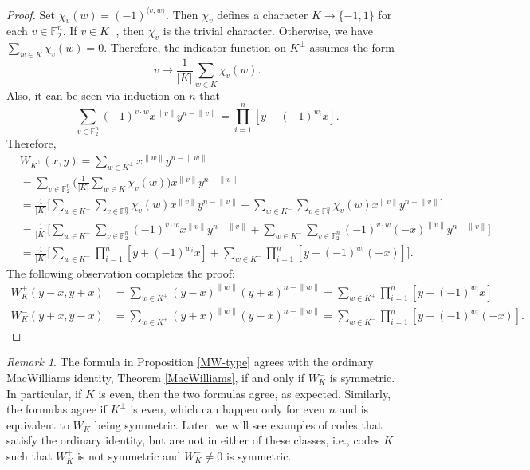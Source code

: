 \documentclass[a4paper,reqno]{amsart}
\theoremstyle{definition}
\theoremstyle{remark} \newtheorem{remark}[theorem]{Remark}
\numberwithin{equation}{section}
\begin{document}
\begin{proof}
Set \(\chi_v(w) = (-1)^{\langle v, w \rangle}\). Then \(\chi_v\) defines a character \(K \to \{-1, 1\}\) for each \(v \in \mathbb{F}_2^n\). If \(v \in K^\perp\), then \(\chi_v\) is the trivial character. Otherwise, we have \(\sum_{w \in K} \chi_v(w) = 0\). Therefore, the indicator function on \(K^\perp\) assumes the form
\begin{equation*}
    v \mapsto \frac{1}{\lvert K \rvert}\sum_{w \in K} \chi_v(w).
\end{equation*}
Also, it can be seen via induction on \(n\) that
\begin{equation*}
    \sum_{v \in \mathbb{F}_2^n} (-1)^{v \cdot w}x^{\lVert v \rVert}y^{n - \lVert v \rVert} = \prod_{i=1}^n[y + (-1)^{w_i}x]. 
\end{equation*}
Therefore,
\begin{align*}
    &W_{K^\perp}(x, y) = \sum_{w \in K^\perp}x^{\lVert w \rVert}y^{n-\lVert w \rVert} \\
    &= \sum_{v \in \mathbb{F}_2^n} \biggl(\frac{1}{\lvert K \rvert}\sum_{w \in K} \chi_v(w)\biggr)x^{\lVert v \rVert}y^{n-\lVert v \rVert} \\
    &= \frac{1}{\lvert K \rvert} \biggl[\sum_{w \in K^+}\sum_{v \in \mathbb{F}_2^n} \chi_v(w)x^{\lVert v \rVert}y^{n-\lVert v \rVert} + \sum_{w \in K^-}\sum_{v \in \mathbb{F}_2^n} \chi_v(w)x^{\lVert v \rVert}y^{n-\lVert v \rVert}\biggr] \\
    &= \frac{1}{\lvert K \rvert} \biggl[\sum_{w \in K^+}\sum_{v \in \mathbb{F}_2^n} (-1)^{v \cdot w}x^{\lVert v \rVert}y^{n-\lVert v \rVert} + \sum_{w \in K^-}\sum_{v \in \mathbb{F}_2^n} (-1)^{v \cdot w}(-x)^{\lVert v \rVert}y^{n-\lVert v \rVert}\biggr] \\
    &= \frac{1}{\lvert K \rvert} \biggl[\sum_{w \in K^+}\prod_{i=1}^n[y + (-1)^{w_i}x] + \sum_{w \in K^-}\prod_{i=1}^n[y + (-1)^{w_i}(-x)]\biggr].
\end{align*}
The following observation completes the proof:
\begin{align*}
    W_K^+ (y-x, y+x) &= \sum_{w \in K^+}(y-x)^{\lVert w \rVert}(y+x)^{n - \lVert w \rVert} = \sum_{w \in K^+} \prod_{i = 1}^n[y + (-1)^{w_i}x] \\
    W_K^- (y+x, y-x) &= \sum_{w \in K^+}(y+x)^{\lVert w \rVert}(y-x)^{n - \lVert w \rVert} = \sum_{w \in K^-} \prod_{i = 1}^n[y + (-1)^{w_i}(-x)].
\end{align*}
\end{proof}

\begin{remark}
    The formula in Proposition \ref{MW-type} agrees with the ordinary MacWilliams identity, Theorem \ref{MacWilliams}, if and only if \(W_K^-\) is symmetric. In particular, if \(K\) is even, then the two formulas agree, as expected. Similarly, the formulas agree if \(K^\perp\) is even, which can happen only for even \(n\) and is equivalent to \(W_K\) being symmetric. %
    Later, we will see examples of codes that satisfy the ordinary identity, but are not in either of these classes, i.e., codes \(K\) such that \(W_K^+\) is not symmetric and \(W_K^- \neq 0\) is symmetric.
\end{remark}
\end{document}
